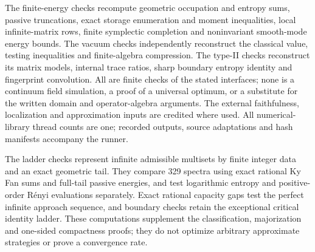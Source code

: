 \documentclass[11pt]{article}
\theoremstyle{definition}
\begin{document}
The finite-energy checks recompute geometric occupation and entropy sums, passive truncations, exact storage enumeration and moment inequalities, local infinite-matrix rows, finite symplectic completion and noninvariant smooth-mode energy bounds. The vacuum checks independently reconstruct the classical value, testing inequalities and finite-algebra compression. The type-II checks reconstruct its matrix models, internal trace ratios, sharp boundary entropy identity and fingerprint convolution. All are finite checks of the stated interfaces; none is a continuum field simulation, a proof of a universal optimum, or a substitute for the written domain and operator-algebra arguments. The external faithfulness, localization and approximation inputs are credited where used. All numerical-library thread counts are one; recorded outputs, source adaptations and hash manifests accompany the runner.

The ladder checks represent infinite admissible multisets by finite integer data and an exact geometric tail. They compare 329 spectra using exact rational Ky Fan sums and full-tail passive energies, and test logarithmic entropy and positive-order R\'enyi evaluations separately. Exact rational capacity gaps test the perfect infinite approach sequence, and boundary checks retain the exceptional critical identity ladder. These computations supplement the classification, majorization and one-sided compactness proofs; they do not optimize arbitrary approximate strategies or prove a convergence rate.


\begingroup\footnotesize
\let\originalthebibliography\thebibliography
\renewcommand{\thebibliography}[1]{\originalthebibliography{#1}\setlength{\itemsep}{0pt}\raggedright}

\endgroup
\end{document}
